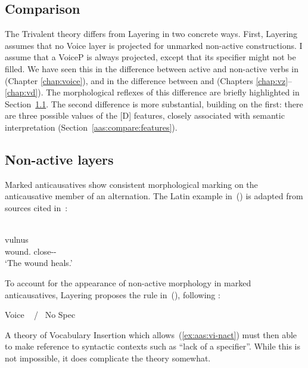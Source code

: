 \begin{exe}
\begin{xlist}
\begin{exe}
\begin{exe}
\begin{xlist}
\begin{exe}
\section{Comparison} \label{aas:compare}
The Trivalent theory differs from Layering in two concrete ways. First, Layering assumes that no Voice layer is projected for unmarked non-active constructions. I assume that a VoiceP is always projected, except that its specifier might not be filled. We have seen this in the difference between active and non-active verbs in {\tkal} (Chapter \ref{chap:voice}), and in the difference between {\vz} and {\vd} (Chapters \ref{chap:vz}--\ref{chap:vd}). The morphological reflexes of this difference are briefly highlighted in Section~\ref{aas:compare:vi-nact}. The second difference  is more substantial, building on the first: there are three possible values of the [D] features, closely associated with semantic interpretation (Section~\ref{aas:compare:features}).

	\subsection{Non-active layers} \label{aas:compare:vi-nact}
Marked anticausatives show consistent morphological marking on the anticausative member of an alternation. The Latin example in~(\nextx) is adapted from sources cited in~\cite{kastnerzu17}:
 \begin{exe}
\ex   {}\\
  \gll vulnus \\
 	  wound. close--\\
 	\glt `The wound heals.' 
	
 \z 

To account for the appearance of non-active morphology in marked anticausatives, Layering proposes the rule in~(\nextx), following \cite{embick04}:
 \begin{exe}
\ex \label{ex:aas:vi-nact}Voice \lra~ / \trace~No Spec 
 \z 

A theory of Vocabulary Insertion which allows~(\ref{ex:aas:vi-nact}) must then able to make reference to syntactic contexts such as ``lack of a specifier''. While this is not impossible, it does complicate the theory somewhat.\label{r1:6:1}


\end{exe}
\end{exe}
\end{exe}
\end{xlist}
\end{exe}
\end{exe}
\end{xlist}
\end{exe}
